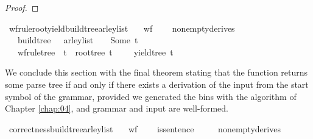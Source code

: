 \begin{isabellebody}
\begin{isamarkuptext}
\begin{proof}
\end{proof}%
\end{isamarkuptext}\isamarkuptrue%
\isamarkupfalse%
\ wf{\isacharunderscore}{\kern0pt}rule{\isacharunderscore}{\kern0pt}root{\isacharunderscore}{\kern0pt}yield{\isacharunderscore}{\kern0pt}build{\isacharunderscore}{\kern0pt}tree{\isacharunderscore}{\kern0pt}{\isasymE}arley{\isacharunderscore}{\kern0pt}list{\isacharcolon}{\kern0pt}\isanewline
\ \ \ {\isachardoublequoteopen}wf{\isacharunderscore}{\kern0pt}{\isasymG}\ {\isasymG}{\isachardoublequoteclose}\isanewline
\ \ \ {\isachardoublequoteopen}nonempty{\isacharunderscore}{\kern0pt}derives\ {\isasymG}{\isachardoublequoteclose}\isanewline
\ \ \ {\isachardoublequoteopen}build{\isacharunderscore}{\kern0pt}tree\ {\isasymG}\ {\isasymomega}\ {\isacharparenleft}{\kern0pt}{\isasymE}arley{\isacharunderscore}{\kern0pt}list\ {\isasymG}\ {\isasymomega}{\isacharparenright}{\kern0pt}\ {\isacharequal}{\kern0pt}\ Some\ t{\isachardoublequoteclose}\isanewline
\ \ \ {\isachardoublequoteopen}wf{\isacharunderscore}{\kern0pt}rule{\isacharunderscore}{\kern0pt}tree\ {\isasymG}\ t\ {\isasymand}\ root{\isacharunderscore}{\kern0pt}tree\ t\ {\isacharequal}{\kern0pt}\ {\isasymSS}\ {\isasymG}\ {\isasymand}\ yield{\isacharunderscore}{\kern0pt}tree\ t\ {\isacharequal}{\kern0pt}\ {\isasymomega}{\isachardoublequoteclose}%
\isadelimproof
%
\endisadelimproof
%
\isatagproof
%
\endisatagproof
{\isafoldproof}%
%
\isadelimproof
%
\endisadelimproof
%
\begin{isamarkuptext}%
We conclude this section with the final theorem stating that the function 
returns some parse tree if and only if there exists a derivation of the input from the start symbol
of the grammar, provided we generated the bins with the algorithm of Chapter \ref{chap:04}, and grammar
and input are well-formed.%
\end{isamarkuptext}\isamarkuptrue%
\isamarkupfalse%
\ correctness{\isacharunderscore}{\kern0pt}build{\isacharunderscore}{\kern0pt}tree{\isacharunderscore}{\kern0pt}{\isasymE}arley{\isacharunderscore}{\kern0pt}list{\isacharcolon}{\kern0pt}\isanewline
\ \ \ {\isachardoublequoteopen}wf{\isacharunderscore}{\kern0pt}{\isasymG}\ {\isasymG}{\isachardoublequoteclose}\isanewline
\ \ \ {\isachardoublequoteopen}is{\isacharunderscore}{\kern0pt}sentence\ {\isasymG}\ {\isasymomega}{\isachardoublequoteclose}\isanewline
\ \ \ {\isachardoublequoteopen}nonempty{\isacharunderscore}{\kern0pt}derives\ {\isasymG}{\isachardoublequoteclose}\isanewline

\end{isabellebody}

